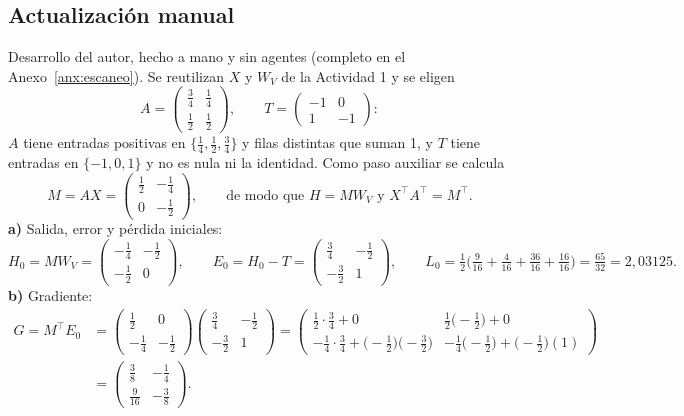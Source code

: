 \documentclass[10pt]{article}
\begin{document}
\subsection{Actualización manual}\label{sec:manual2}
Desarrollo del autor, hecho a mano y sin agentes (completo en el Anexo~\ref{anx:escaneo}).
Se reutilizan $X$ y $W_V$ de la Actividad 1 y se eligen
\[
  A = \begin{pmatrix}\tfrac34&\tfrac14\\[0.4ex]\tfrac12&\tfrac12\end{pmatrix},\qquad
  T = \begin{pmatrix}-1&0\\1&-1\end{pmatrix}:
\]
$A$ tiene entradas positivas en $\{\tfrac14,\tfrac12,\tfrac34\}$ y filas distintas que suman 1, y $T$
tiene entradas en $\{-1,0,1\}$ y no es nula ni la identidad. Como paso auxiliar se calcula
\[
  M = AX = \begin{pmatrix}\frac12&-\frac14\\[0.3ex]0&-\frac12\end{pmatrix},
  \qquad\text{de modo que } H = MW_V \text{ y } X^\top A^\top = M^\top .
\]
\textbf{a)} Salida, error y pérdida iniciales:
\[
  H_0 = MW_V = \begin{pmatrix}-\frac14&-\frac12\\[0.3ex]-\frac12&0\end{pmatrix},\qquad
  E_0 = H_0 - T = \begin{pmatrix}\frac34&-\frac12\\[0.3ex]-\frac32&1\end{pmatrix},\qquad
  L_0 = \tfrac12\Big(\tfrac9{16}+\tfrac4{16}+\tfrac{36}{16}+\tfrac{16}{16}\Big) = \tfrac{65}{32} = 2{,}03125 .
\]
\textbf{b)} Gradiente:
\begin{align*}
  G = M^\top E_0
  &= \begin{pmatrix}\frac12&0\\[0.3ex]-\frac14&-\frac12\end{pmatrix}
     \begin{pmatrix}\frac34&-\frac12\\[0.3ex]-\frac32&1\end{pmatrix}
   = \begin{pmatrix}\frac12\cdot\frac34+0 & \frac12\big(-\frac12\big)+0\\[0.5ex]
                    -\frac14\cdot\frac34+\big(-\frac12\big)\big(-\frac32\big) & -\frac14\big(-\frac12\big)+\big(-\frac12\big)(1)\end{pmatrix}\\
  &= \begin{pmatrix}\frac38&-\frac14\\[0.3ex]\frac9{16}&-\frac38\end{pmatrix}.
\end{align*}
\end{document}
